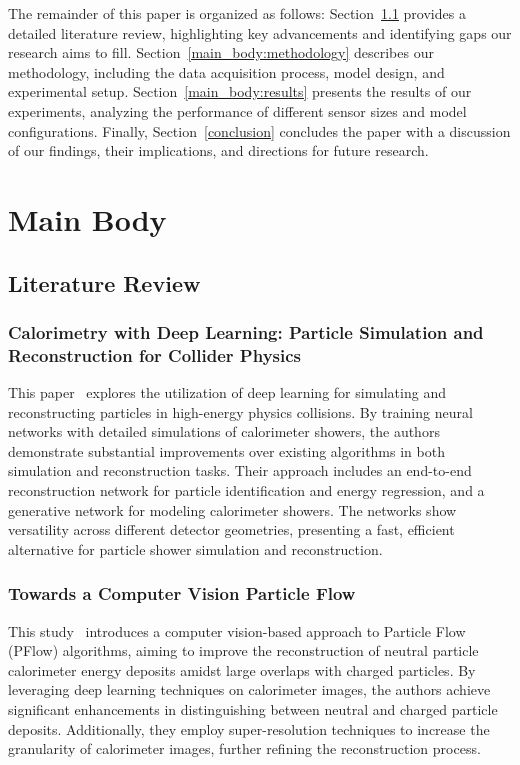 \documentclass[conference]{IEEEtran}
\begin{document}
The remainder of this paper is organized as follows: Section~\ref{main_body:literature_review} provides a detailed literature review, highlighting key advancements and identifying gaps our research aims to fill. Section~\ref{main_body:methodology} describes our methodology, including the data acquisition process, model design, and experimental setup. Section~\ref{main_body:results} presents the results of our experiments, analyzing the performance of different sensor sizes and model configurations. Finally, Section~\ref{conclusion} concludes the paper with a discussion of our findings, their implications, and directions for future research.

\section{Main Body}
\label{main_body}

\subsection{Literature Review}
\label{main_body:literature_review}

\subsubsection{Calorimetry with Deep Learning: Particle Simulation and Reconstruction for Collider Physics}

This paper~\cite{Belayneh_2020} explores the utilization of deep learning for simulating and reconstructing particles in high-energy physics collisions. By training neural networks with detailed simulations of calorimeter showers, the authors demonstrate substantial improvements over existing algorithms in both simulation and reconstruction tasks. Their approach includes an end-to-end reconstruction network for particle identification and energy regression, and a generative network for modeling calorimeter showers. The networks show versatility across different detector geometries, presenting a fast, efficient alternative for particle shower simulation and reconstruction.

\subsubsection{Towards a Computer Vision Particle Flow}

This study~\cite{Di_Bello_2021} introduces a computer vision-based approach to Particle Flow (PFlow) algorithms, aiming to improve the reconstruction of neutral particle calorimeter energy deposits amidst large overlaps with charged particles. By leveraging deep learning techniques on calorimeter images, the authors achieve significant enhancements in distinguishing between neutral and charged particle deposits. Additionally, they employ super-resolution techniques to increase the granularity of calorimeter images, further refining the reconstruction process.
\end{document}
